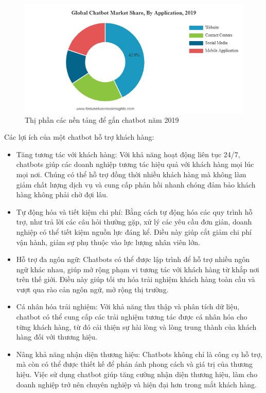\begin{figure}[!ht]
    \centering
    \includegraphics[width=\linewidth]{Images/P1/da1.png}
    \vspace{0.5cm}
    \caption{Thị phần các nền tảng để gắn chatbot năm 2019}
\end{figure}

Các lợi ích của một chatbot hỗ trợ khách hàng:
\begin{itemize}
    \item Tăng tương tác với khách hàng: Với khả năng hoạt động liên tục 24/7, chatbots giúp các doanh nghiệp tương tác hiệu quả với khách hàng mọi lúc mọi nơi. Chúng có thể hỗ trợ đồng thời nhiều khách hàng mà không làm giảm chất lượng dịch vụ và cung cấp phản hồi nhanh chóng đảm bảo khách hàng không phải chờ đợi lâu.
    \item Tự động hóa và tiết kiệm chi phí: Bằng cách tự động hóa các quy trình hỗ trợ, như trả lời các câu hỏi thường gặp, xử lý các yêu cầu đơn giản, doanh nghiệp có thể tiết kiệm nguồn lực đáng kể. Điều này giúp cắt giảm chi phí vận hành, giảm sự phụ thuộc vào lực lượng nhân viên lớn.
    \item Hỗ trợ đa ngôn ngữ: Chatbots có thể được lập trình để hỗ trợ nhiều ngôn ngữ khác nhau, giúp mở rộng phạm vi tương tác với khách hàng từ khắp nơi trên thế giới. Điều này giúp tối ưu hóa trải nghiệm khách hàng toàn cầu và vượt qua rào cản ngôn ngữ, mở rộng thị trường.
    \item Cá nhân hóa trải nghiệm: Với khả năng thu thập và phân tích dữ liệu, chatbot có thể cung cấp các trải nghiệm tương tác được cá nhân hóa cho từng khách hàng, từ đó cải thiện sự hài lòng và lòng trung thành của khách hàng đối với thương hiệu.
    \item Nâng khả năng nhận diện thương hiệu: Chatbots không chỉ là công cụ hỗ trợ, mà còn có thể được thiết kế để phản ánh phong cách và giá trị của thương hiệu. Việc sử dụng chatbot giúp tăng cường nhận diện thương hiệu, làm cho doanh nghiệp trở nên chuyên nghiệp và hiện đại hơn trong mắt khách hàng.
\end{itemize}

